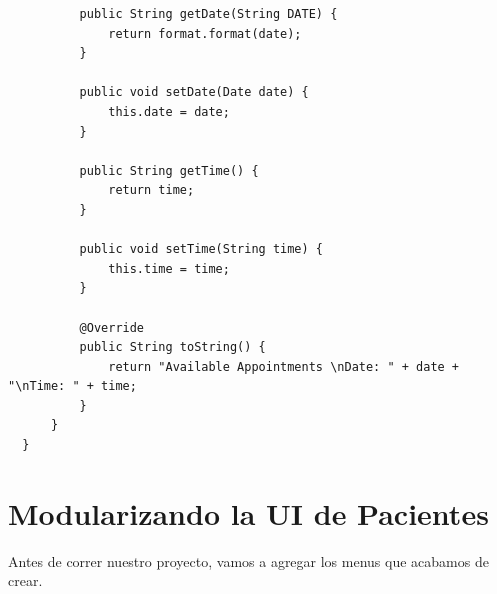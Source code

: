 \documentclass{article}
\begin{document}
\begin{verbatim}
          public String getDate(String DATE) {
              return format.format(date);
          }

          public void setDate(Date date) {
              this.date = date;
          }

          public String getTime() {
              return time;
          }

          public void setTime(String time) {
              this.time = time;
          }

          @Override
          public String toString() {
              return "Available Appointments \nDate: " + date + "\nTime: " + time;
          }
      }
  }
\end{verbatim}


\section{Modularizando la UI de Pacientes}%
Antes de correr nuestro proyecto, vamos a agregar los menus que acabamos de
crear.\\
\end{document}
